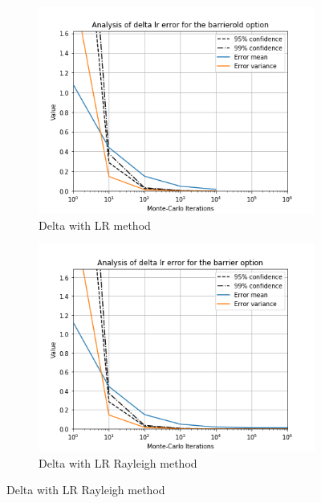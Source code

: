 \documentclass[11pt,a4paper,fleqn]{article}
\begin{document}
\begin{figure}[h!]
  \centering
      \begin{subfigure}[b]{0.45\textwidth}
          \includegraphics[width=\textwidth]{graphs/barrierolddeltalr.png}
          \caption{Delta with LR method}
      \end{subfigure}
      \begin{subfigure}[b]{0.45\textwidth}
          \includegraphics[width=\textwidth]{graphs/barrierdeltalr.png}
          \caption{Delta with LR Rayleigh method}
      \end{subfigure}


\end{figure}
\end{document}

